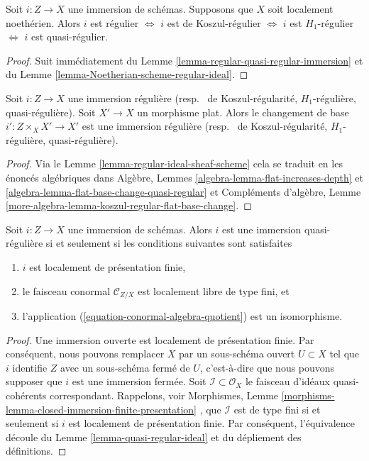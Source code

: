 \begin{lemma}
\label{lemma-regular-immersion-noetherian}
Soit  $i : Z \to X$  une immersion de schémas. Supposons que  $X$  soit
localement noethérien. Alors  $i$  est régulier  $\Leftrightarrow$   $i$ 
est de Koszul-régulier  $\Leftrightarrow$   $i$  est  $H_1$-régulier
 $\Leftrightarrow$   $i$  est quasi-régulier.
\end{lemma}

\begin{proof}
Suit immédiatement du Lemme  \ref{lemma-regular-quasi-regular-immersion}  et du Lemme  \ref{lemma-Noetherian-scheme-regular-ideal}.
\end{proof}

\begin{lemma}
\label{lemma-flat-base-change-regular-immersion}
Soit  $i : Z \to X$  une immersion régulière (resp. \  de
Koszul-régularité,  $H_1$-régulière, quasi-régulière). Soit  $X' \to X$  un
morphisme plat. Alors le changement de base  $i' : Z \times_X X' \to X'$  est une immersion
régulière (resp. \  de Koszul-régularité,  $H_1$-régulière,
quasi-régulière).
\end{lemma}

\begin{proof}
Via le Lemme  \ref{lemma-regular-ideal-sheaf-scheme}  cela se traduit en les énoncés algébriques dans Algèbre,
Lemmes  \ref{algebra-lemma-flat-increases-depth}  et  \ref{algebra-lemma-flat-base-change-quasi-regular}  et Compléments d'algèbre, Lemme  \ref{more-algebra-lemma-koszul-regular-flat-base-change}.
\end{proof}

\begin{lemma}
\label{lemma-quasi-regular-immersion}
Soit  $i : Z \to X$  une immersion de schémas. Alors  $i$  est une immersion
quasi-régulière si et seulement si les conditions suivantes sont satisfaites
\begin{enumerate}
\item $i$  est localement de présentation finie,
\item le faisceau conormal  $\mathcal{C}_{Z/X}$  est localement libre de type fini, et
\item l'application (\ref{equation-conormal-algebra-quotient}) est un isomorphisme.
\end{enumerate}
\end{lemma}

\begin{proof}
Une immersion ouverte est localement de présentation finie. Par conséquent, nous
pouvons remplacer  $X$  par un sous-schéma ouvert  $U \subset X$  tel que
 $i$  identifie  $Z$  avec un sous-schéma fermé de  $U$,
c’est-à-dire que nous pouvons supposer que  $i$  est une immersion fermée.
Soit  $\mathcal{I} \subset \mathcal{O}_X$  le faisceau d'idéaux quasi-cohérents correspondant. Rappelons,
voir Morphismes, Lemme  \ref{morphisms-lemma-closed-immersion-finite-presentation} , que  $\mathcal{I}$  est de type fini si et
seulement si  $i$  est localement de présentation finie. Par conséquent,
l'équivalence découle du Lemme  \ref{lemma-quasi-regular-ideal}  et du dépliement des définitions.
\end{proof}

